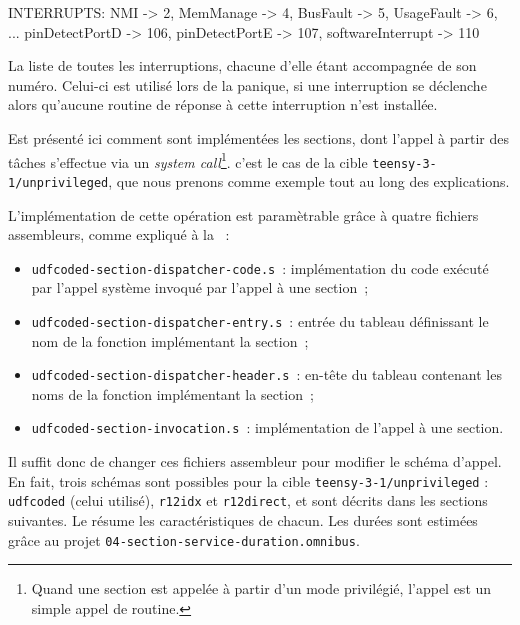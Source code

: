 
\begin{OMNIBUS}
INTERRUPTS:
  NMI -> 2,
  MemManage -> 4,
  BusFault -> 5,
  UsageFault -> 6,
  ...
  pinDetectPortD -> 106,
  pinDetectPortE -> 107,
  softwareInterrupt -> 110
\end{OMNIBUS}


La liste de toutes les interruptions, chacune d'elle étant accompagnée de son numéro. Celui-ci est utilisé lors de la panique, si une interruption se déclenche alors qu'aucune routine de réponse à cette interruption n'est installée.







Est présenté ici comment sont implémentées les sections, dont l'appel à partir des tâches s'effectue via un \emph{system call}\footnote{Quand une section est appelée à partir d'un mode privilégié, l'appel est un simple appel de routine.}. c'est le cas de la cible \texttt{teensy-3-1/unprivileged}, que nous prenons comme exemple tout au long des explications.

L'implémentation de cette opération est paramètrable grâce à quatre fichiers assembleurs, comme expliqué à la ~:
\begin{itemize}
  \item \texttt{udfcoded-section-dispatcher-code.s}~: implémentation du code exécuté par l'appel système invoqué par l'appel à une section~;
  \item \texttt{udfcoded-section-dispatcher-entry.s}~: entrée du tableau définissant le nom de la fonction implémentant la section~;
  \item \texttt{udfcoded-section-dispatcher-header.s}~: en-tête du tableau contenant les noms de la fonction implémentant la section~;
  \item \texttt{udfcoded-section-invocation.s}~: implémentation de l'appel à une section.
\end{itemize}

Il suffit donc de changer ces fichiers assembleur pour modifier le schéma d'appel. En fait, trois schémas sont possibles pour la cible \texttt{teensy-3-1/unprivileged} : \texttt{udfcoded} (celui utilisé), \texttt{r12idx} et \texttt{r12direct}, et sont décrits dans les sections suivantes. Le  résume les caractéristiques de chacun. Les durées sont estimées grâce au projet \texttt{04-section-service-duration.omnibus}.

